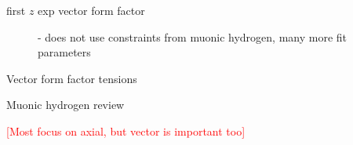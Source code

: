 \begin{description}
\item[first $z$ exp vector form factor] \cite{Ye:2017gyb}
 - does not use constraints from muonic hydrogen, many more fit parameters
\item[Vector form factor tensions] \cite{Borah:2020gte}
\item[Muonic hydrogen review] \cite{Hill:2017wgb}
\end{description}

\textcolor{red}{[Most focus on axial, but vector is important too]}

